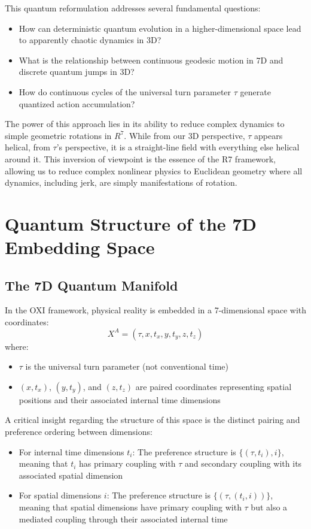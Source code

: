 \documentclass{article}
\begin{document}
This quantum reformulation addresses several fundamental questions:
\begin{itemize}
\item How can deterministic quantum evolution in a higher-dimensional space lead to apparently chaotic dynamics in 3D?
\item What is the relationship between continuous geodesic motion in 7D and discrete quantum jumps in 3D?
\item How do continuous cycles of the universal turn parameter $\tau$ generate quantized action accumulation?
\end{itemize}

The power of this approach lies in its ability to reduce complex dynamics to simple geometric rotations in $R^7$. While from our 3D perspective, $\tau$ appears helical, from $\tau$'s perspective, it is a straight-line field with everything else helical around it. This inversion of viewpoint is the essence of the R7 framework, allowing us to reduce complex nonlinear physics to Euclidean geometry where all dynamics, including jerk, are simply manifestations of rotation.

\section{Quantum Structure of the 7D Embedding Space}

\subsection{The 7D Quantum Manifold}

In the OXI framework, physical reality is embedded in a 7-dimensional space with coordinates:
\begin{equation}
X^A = (\tau, x, t_x, y, t_y, z, t_z)
\end{equation}
where:
\begin{itemize}
\item $\tau$ is the universal turn parameter (not conventional time)
\item $(x, t_x)$, $(y, t_y)$, and $(z, t_z)$ are paired coordinates representing spatial positions and their associated internal time dimensions
\end{itemize}

A critical insight regarding the structure of this space is the distinct pairing and preference ordering between dimensions:

\begin{itemize}
\item For internal time dimensions $t_i$: The preference structure is $\{(\tau, t_i), i\}$, meaning that $t_i$ has primary coupling with $\tau$ and secondary coupling with its associated spatial dimension
\item For spatial dimensions $i$: The preference structure is $\{(\tau, (t_i, i))\}$, meaning that spatial dimensions have primary coupling with $\tau$ but also a mediated coupling through their associated internal time
\end{itemize}
\end{document}
